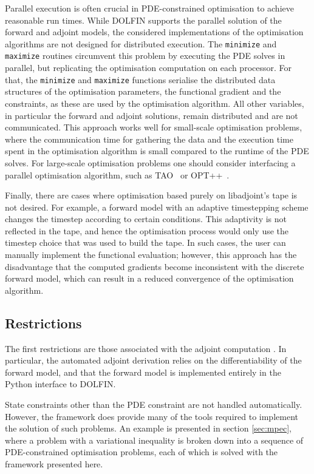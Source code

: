 \documentclass[prodmode,acmtoms]{acmsmall}
\newcommand{\dolfin}{{\mbox{DOLFIN}}\xspace}
\newcommand{\libadjoint}{\mbox{{libadjoint}}\xspace}
\begin{document}
Parallel execution is often crucial in PDE-constrained optimisation to achieve reasonable run times. 
While \dolfin supports the parallel solution of the forward and adjoint models, the considered implementations of the optimisation algorithms are not designed for distributed execution.
The \texttt{minimize} and \texttt{maximize} routines circumvent this problem by executing the PDE solves in parallel, 
but replicating the optimisation computation on each processor. For that, the \texttt{minimize} and \texttt{maximize} functions serialise the distributed data structures of the optimisation parameters, 
the functional gradient and the constraints, as these are used by the optimisation algorithm.
All other variables, in particular the forward and adjoint solutions, remain distributed and are not communicated. 
This approach works well for small-scale optimisation problems, where the communication time for 
gathering the data and the execution time spent in the 
optimisation algorithm is small compared to the runtime of the PDE solves.
For large-scale optimisation problems one should consider interfacing a 
parallel optimisation algorithm, such as TAO~\cite{tao2012} or OPT++~\cite{meza1994}.

Finally, there are cases where optimisation based purely on \libadjoint's tape is not desired. 
For example, a forward model with an adaptive timestepping scheme changes the timestep according to certain conditions.
This adaptivity is not reflected in the tape, and hence the optimisation process would only use the timestep choice that was used to build the tape.
In such cases, the user can manually implement the functional evaluation; however, this approach has the disadvantage that 
the computed gradients become inconsistent with the discrete forward model, which can result in a reduced convergence of the optimisation algorithm.

\subsection{Restrictions}\label{sec:restrictions}
The first restrictions are those associated with the adjoint computation \cite[\S5.4]{farrell2012}.
In particular, the automated adjoint derivation relies on the differentiability of the forward model,
and that the forward model is implemented entirely in the Python interface to DOLFIN. 

State constraints other than the PDE constraint are not handled
automatically. However, the framework does provide many of the tools required to implement the solution
of such problems. An example is presented in section \ref{sec:mpec}, where a problem with a variational
inequality is broken down into a sequence of PDE-constrained optimisation problems, each of which is solved
with the framework presented here.
\end{document}
